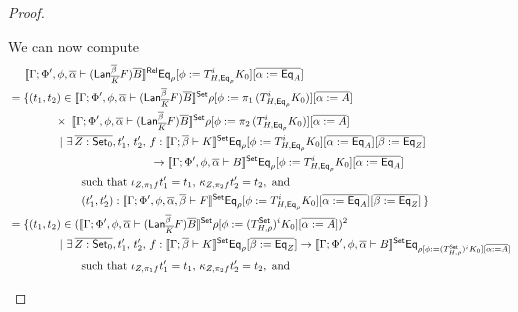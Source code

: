 \documentclass[acmsmall,review,anonymous]{acmart}
\theoremstyle{definition}
\newcommand{\set}{\mathsf{Set}}
\begin{document}
\begin{proof}
\begin{itemize}
\begin{itemize}
{%
We can now compute 
\begin{align*}
&\hspace*{0.2in}\oCPORsem{\Gamma;\Phi',\phi,\ol\alpha
    \vdash (\Lan_{\ol K}^{\ol \beta} F)\ol{B}}  \Eq_{\rho} [\phi :=
    T^i_{H,\Eq_{\rho}} K_0] [\overline{\alpha := \Eq_A}]\\
&= \{(t_1,t_2) \in \oCPOsem{\Gamma;\Phi',\phi,\ol\alpha
    \vdash (\Lan_{\ol K}^{\ol \beta} F)\ol{B}} \rho [\phi := \pi_1\,
    (T^i_{H,\Eq_{\rho}} K_0)] [\overline{\alpha := A}]\\
& \hspace*{0.57in}\times\;
  \oCPOsem{\Gamma;\Phi',\phi,\ol\alpha \vdash (\Lan_{\ol
      K}^{\ol \beta} F)\ol{B}} \rho [\phi := \pi_2\,
    (T^i_{H,\Eq_{\rho}} K_0)] [\overline{\alpha := A}]\\
  & \hspace*{0.63in}|~\exists\, \ol{Z : \oCPO_0}, t_1',\, t_2',\,
  f : \oCPOsem{\Gamma;\ol\beta \vdash K} \Eq_\rho
  [\phi := T^i_{H,\Eq_{\rho}} K_0] [\overline{\alpha := \Eq_A}]
  [\overline{\beta := \Eq_Z}]\\
  & \hspace*{1.75in}\to \oCPOsem{\Gamma;\Phi',
    \phi,\ol\alpha \vdash B} \Eq_\rho [\phi := T^i_{H,\Eq_{\rho}} K_0]
  [\overline{\alpha := \Eq_A}]\\
  &\hspace{0.9in}\mbox{such that } \iota_{Z,\pi_1 f}t_1' = t_1,\,
  \kappa_{Z,\pi_2 f}t_2' = t_2, \mbox{ and }\\
  &\hspace*{0.9in}(t_1',t_2') : \oCPOsem{\Gamma;\Phi',
    \phi,\ol\alpha,\ol\beta \vdash F} \Eq_\rho [\phi := T^i_{H,\Eq_{\rho}} K_0]
  [\overline{\alpha := \Eq_A}][\ol{\beta :=\Eq_Z}]\,\}\\
%
  &= \{(t_1,t_2) \in (\oCPOsem{\Gamma;\Phi',\phi,\ol\alpha
    \vdash (\Lan_{\ol K}^{\ol \beta} F)\ol{B}} \rho [\phi := 
    (T^\set_{H,{\rho}})^i K_0] [\overline{\alpha := A}])^2\\
  & \hspace*{0.63in}|~\exists\, \ol{Z : \oCPO_0}, t_1',\, t_2',\,
  f : \oCPOsem{\Gamma;\ol\beta \vdash K} \Eq_\rho[\overline{\beta :=
      \Eq_Z}]\to \oCPOsem{\Gamma;\Phi',
    \phi,\ol\alpha \vdash B} \Eq_{\rho[\phi := (T^\set_{H,{\rho}})^i K_0] 
  [\overline{\alpha := A}]}\\
  &\hspace{0.9in}\mbox{such that } \iota_{Z,\pi_1 f}t_1' = t_1,\,
  \kappa_{Z,\pi_2 f}t_2' = t_2, \mbox{ and }\\

\end{align*}}
\end{itemize}
\end{itemize}
\end{proof}
\end{document}
